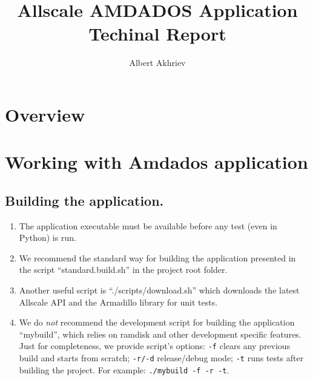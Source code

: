 \documentclass[]{article}
\title{Allscale AMDADOS Application \\ Techinal Report}
\author{Albert Akhriev}
\begin{document}
\maketitle

\section{Overview}

\section{Working with Amdados application}

\subsection{Building the application.}
\begin{enumerate}
\item The application executable must be available before any test (even in Python) is run.
\item We recommend the standard way for building the application presented in the script ``standard.build.sh'' in the project root folder.
\item Another useful script is ``./scripts/download.sh'' which downloads the latest Allscale API and the Armadillo library for unit tests.
\item We do \textit{not} recommend the development script for building the application ``mybuild'', which relies on ramdisk and other development specific features. Just for completeness, we provide script's options: \texttt{-f} clears any previous build and starts from scratch; \texttt{-r/-d} release/debug mode; \texttt{-t} runs tests after building the project. For example: \texttt{./mybuild -f -r -t}.
\end{enumerate}
\end{document}
